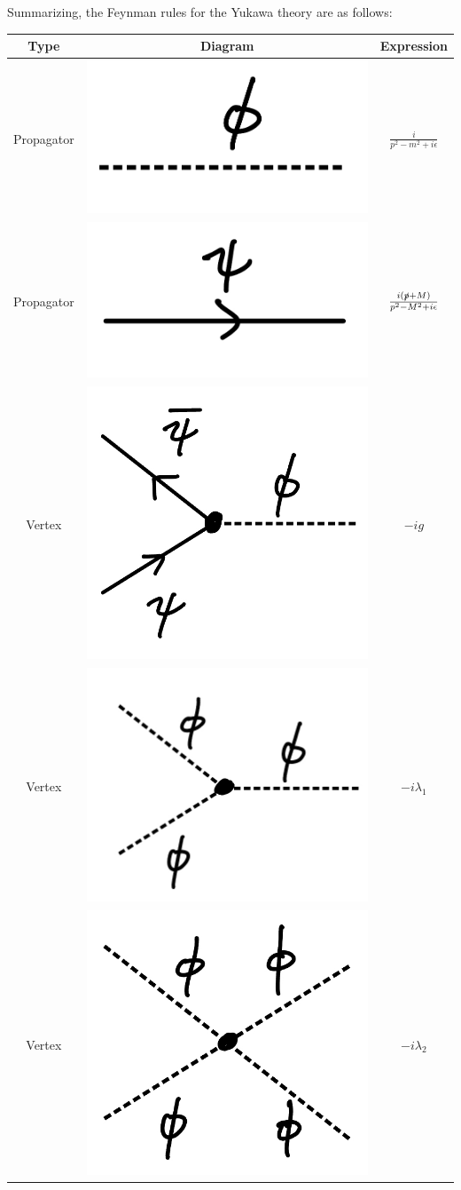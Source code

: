 {Summarizing, the Feynman rules for the Yukawa theory are as follows:
\begin{table}
\centering
\begin{tabular}{c|c|c}
    Type & Diagram & Expression \\
    \hline
    Propagator & \includegraphics[width=0.2\linewidth]{KG_prop.jpeg} & $\frac{i}{p^2 - m^2 + i \epsilon}$ \\
    \hline
    Propagator & \includegraphics[width=0.2\linewidth]{D_prop.jpeg} & $\frac{i( \slashed{p} + M )}{p^2 - M^2 + i \epsilon}$ \\
    \hline
    Vertex & \includegraphics[width=0.2\linewidth]{Y_int1.jpeg} & $- i g$ \\
    \hline
    Vertex & \includegraphics[width=0.2\linewidth]{Y_int2.jpeg} & $- i \lambda_1$ \\
    \hline
    Vertex & \includegraphics[width=0.2\linewidth]{Y_int3.jpeg} & $- i \lambda_2$
\end{tabular}
\end{table}


}
    

